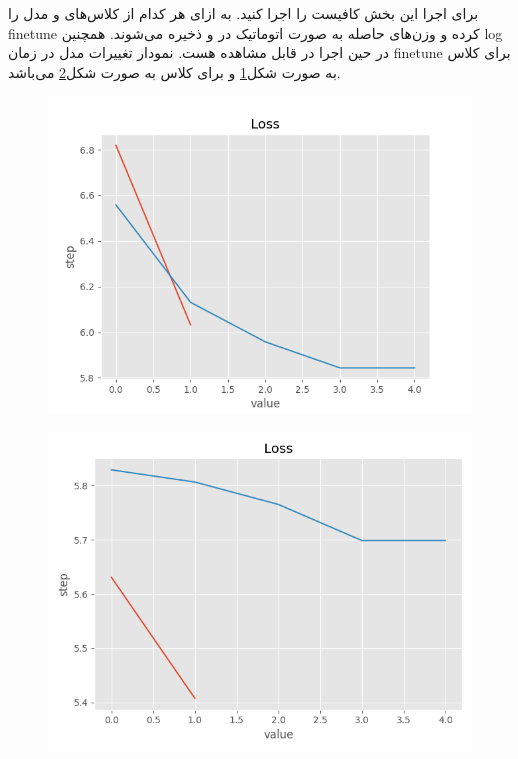 \documentclass[10pt]{article}
\begin{document}
برای اجرا این بخش کافیست
را اجرا کنید.
به ازای هر کدام از کلاس‌های 
و
مدل را finetune کرده و وزن‌های حاصله به صورت اتوماتیک در
و
ذخیره می‌شوند. همچنین log در حین اجرا در 
قابل مشاهده هست. نمودار تغییرات  
مدل در زمان finetune برای کلاس
 به صورت شکل\ref{GPT_dep}
 و برای کلاس
به صورت شکل\ref{GPT_hap}
می‌باشد.
	\begin{figure}[H]
		\centering\includegraphics[width=\linewidth]{../reports/loss_history_GPT2_depression.png}
		\caption{ 
			}
		\label{GPT_dep}
	\end{figure}
	
		\begin{figure}[H]
		\centering\includegraphics[width=\linewidth]{../reports/loss_history_GPT2_happiness.png}
		\caption{ 
			}
		\label{GPT_hap}
	\end{figure}
\end{document}
